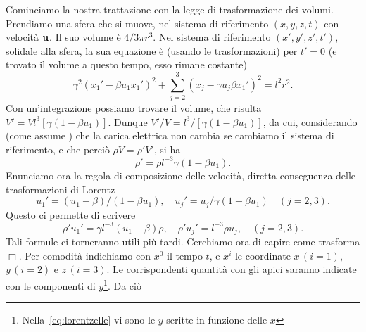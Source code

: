 Cominciamo la nostra trattazione con la legge di trasformazione dei
volumi. Prendiamo una sfera che si muove, nel sistema di riferimento
$(x,y,z,t)$ con velocit\`a $\mathbf{u}$. Il suo volume \`e $4/3 \pi
r^{3}$. Nel sistema di riferimento $(x',y',z',t')$, solidale alla
sfera, la sua equazione \`e (usando le trasformazioni) per $t'=0$ (e
trovato il volume a questo tempo, esso rimane costante)
\begin{displaymath}
  \gamma^{2} \left( x_{1}' - \beta u_{1} x_{1}' \right)^{2} + 
  \sum_{j=2}^{3}\left(x_{j} - \gamma u_{j} \beta x_{1}'\right)^{2} =
 l^{2} r^{2}. 
\end{displaymath}
Con un'integrazione possiamo trovare il volume, che risulta $V' = V
l^{3} [\gamma(1-\beta u_{1})]$. Dunque $V' / V = l^{3} / [\gamma
(1-\beta u_{1})]$, da cui, considerando (come assume \poin) che la carica elettrica non
cambia se cambiamo il sistema di riferimento, e che perci\`o $\rho V =
\rho' V'$, si ha
\begin{equation}
  \rho' = \rho l^{-3} \gamma (1 - \beta u_{1}).
  \label{eq:rhoprimo}
\end{equation}
Enunciamo ora la regola di composizione delle velocit\`a, diretta
conseguenza delle trasformazioni di Lorentz
\begin{equation}
  u_{1}' = (u_{1} - \beta) / (1 - \beta u_{1}), 
  \quad  
  u_{j}' = u_{j} / \gamma (1-\beta u_{1}) 
  \quad 
  (j=2,3).
  \label{eq:vel}
\end{equation}
Questo ci permette di scrivere
\begin{displaymath}
  \rho' u_{1}' = \gamma l^{-3} (u_{1} - \beta) \rho,
  \quad
  \rho' u_{j}'  = l^{-3} \rho u_{j},
  \quad
  (j=2,3).
\end{displaymath}
Tali formule ci torneranno utili pi\`u tardi. Cerchiamo ora di capire
come trasforma $\Box$. Per comodit\`a indichiamo con $x^{0}$ il tempo
$t$, e $x^{i}$ le coordinate $x \,(i=1)$, $y \,(i=2)$ e $z \,
(i=3)$. Le corrispondenti quantit\`a con gli apici saranno indicate
con le componenti di $y$\footnote{Nella~\eqref{eq:lorentzelle} vi sono
  le $y$ scritte in funzione delle $x$ }.  Da ci\`o

